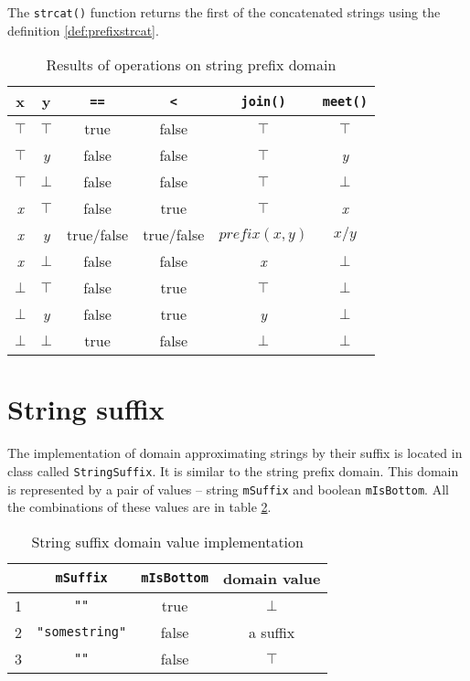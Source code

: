 \documentclass[12pt,final,oneside]{fithesis2}
\theoremstyle{definition}
\begin{document}
The \texttt{strcat()} function returns the first of the concatenated strings
using the definition \ref{def:prefixstrcat}.

\begin{table}[ht]
\centering
\begin{tabular}{c|c|c|c|c|c}
 x & y & \texttt{==} & \texttt{<} & \texttt{join()} & \texttt{meet()} \\
\hline
$\top$     & $\top$     & true       & false      & $\top$       & $\top$ \\
$\top$     & \textit{y} & false      & false      & $\top$       & \textit{y} \\
$\top$     & $\bot$     & false      & false      & $\top$       & $\bot$ \\
\textit{x} & $\top$     & false      & true       & $\top$       & \textit{x} \\
\textit{x} & \textit{y} & true/false & true/false & $\textit{prefix}(x, y)$ & $x/y$ \\
\textit{x} & $\bot$     & false      & false      & \textit{x}   & $\bot$ \\
$\bot$     & $\top$     & false      & true       & $\top$       & $\bot$ \\
$\bot$     & \textit{y} & false      & true       & \textit{y}   & $\bot$ \\
$\bot$     & $\bot$     & true       & false      & $\bot$       & $\bot$
\end{tabular}
\caption{Results of operations on string prefix domain}
\label{tab:prefixops}
\end{table}


\section{String suffix}

The implementation of domain approximating strings by their suffix is located in
class called \texttt{StringSuffix}. It is similar to the string prefix domain.
This domain is represented by a pair of values -- string
\texttt{mSuffix} and boolean \texttt{mIsBottom}. All the combinations of these
values are in table \ref{tab:stringsuffix}.

\begin{table}[ht]
\centering
\begin{tabular}{r|c|c|c}
  & \texttt{mSuffix}      & \texttt{mIsBottom} & domain value \\
\hline
1 & \texttt{""}           & true      & $\bot$ \\
2 & \texttt{"somestring"} & false     & a suffix \\
3 & \texttt{""}           & false     & $\top$
\end{tabular}
\caption{String suffix domain value implementation}
\label{tab:stringsuffix}
\end{table}
\end{document}
